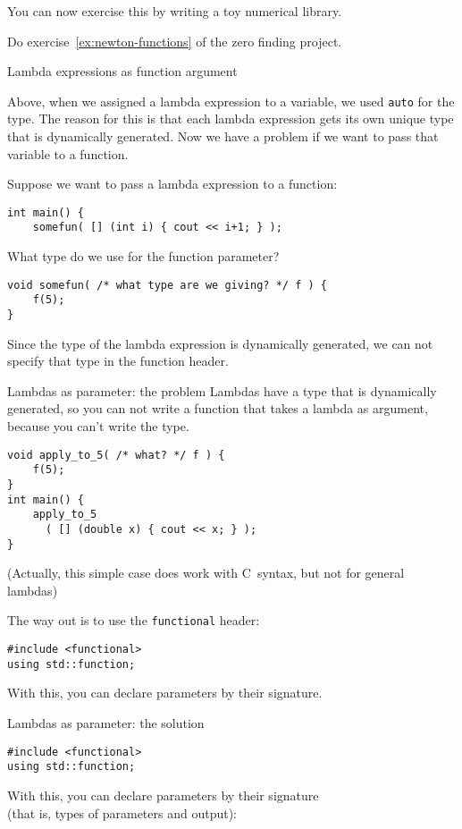 You can now exercise this by writing a toy numerical library.

\begin{exercise}
  Do exercise~\ref{ex:newton-functions} of the zero finding project.
\end{exercise}

 {Lambda expressions as function argument}
\label{sec:lambdaauto}

Above, when we assigned a lambda expression to a variable,
we used \lstinline{auto} for the type.
The reason for this is that each lambda expression gets its own
unique type that is dynamically generated.
Now we have a problem if we want to pass that variable to a function.

Suppose we want to pass a lambda expression to a function:
\begin{lstlisting}
int main() {
    somefun( [] (int i) { cout << i+1; } );
\end{lstlisting}
What type do we use for the function parameter?
\begin{lstlisting}
void somefun( /* what type are we giving? */ f ) {
    f(5);
}
\end{lstlisting}
Since the type of the lambda expression is dynamically generated,
we can not specify that type in the function header.

\begin{slide}{Lambdas as parameter: the problem}
  \label{sl:lambda-apply5}
  Lambdas have a type that is dynamically  generated,
  so you can not write a function
  that takes a lambda as argument, because you can't write the type.
  
  \lstset{numbers=left,numberstyle=\tiny}
\begin{lstlisting}
void apply_to_5( /* what? */ f ) {
    f(5);
}
int main() {
    apply_to_5
      ( [] (double x) { cout << x; } );
}
\end{lstlisting}
(Actually, this simple case does work with C~syntax,
but not for general lambdas)
\end{slide}

The way out is to use the \lstinline{functional} header:
\begin{lstlisting}
#include <functional>
using std::function;
\end{lstlisting}
With this, you can declare parameters by their signature.

\begin{slide}{Lambdas as parameter: the solution}
  \label{sl:lambda-function-parm}
\begin{lstlisting}
#include <functional>
using std::function;
\end{lstlisting}
With this, you can declare parameters by their signature\\
(that is, types of parameters and output):
%
\end{slide}

